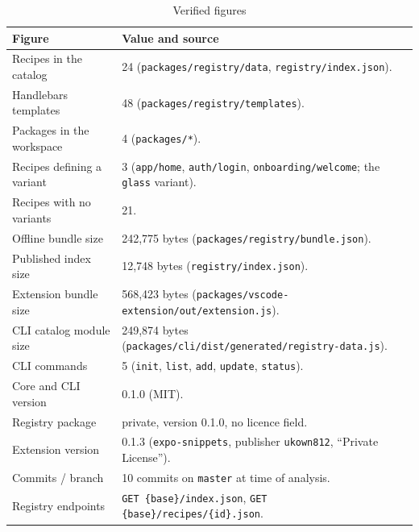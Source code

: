 \begin{longtable}{p{6cm}p{8.2cm}}
\caption{Verified figures}\\
\toprule
\textbf{Figure} & \textbf{Value and source} \\
\midrule

Recipes in the catalog & 24 (\texttt{packages/registry/data}, \texttt{registry/index.json}). \\
Handlebars templates & 48 (\texttt{packages/registry/templates}). \\
Packages in the workspace & 4 (\texttt{packages/*}). \\
Recipes defining a variant & 3 (\texttt{app/home}, \texttt{auth/login},
\texttt{onboarding/welcome}; the \texttt{glass} variant). \\
Recipes with no variants & 21. \\
Offline bundle size & 242{,}775 bytes (\texttt{packages/registry/bundle.json}). \\
Published index size & 12{,}748 bytes (\texttt{registry/index.json}). \\
Extension bundle size & 568{,}423 bytes
(\texttt{packages/vscode-extension/out/extension.js}). \\
CLI catalog module size & 249{,}874 bytes
(\texttt{packages/cli/dist/generated/registry-data.js}). \\
CLI commands & 5 (\texttt{init}, \texttt{list}, \texttt{add}, \texttt{update},
\texttt{status}). \\
Core and CLI version & 0.1.0 (MIT). \\
Registry package & private, version 0.1.0, no licence field. \\
Extension version & 0.1.3 (\texttt{expo-snippets}, publisher \texttt{ukown812},
``Private License''). \\
Commits / branch & 10 commits on \texttt{master} at time of analysis. \\
Registry endpoints & \texttt{GET \{base\}/index.json},
\texttt{GET \{base\}/recipes/\{id\}.json}. \\
\bottomrule
\end{longtable}
